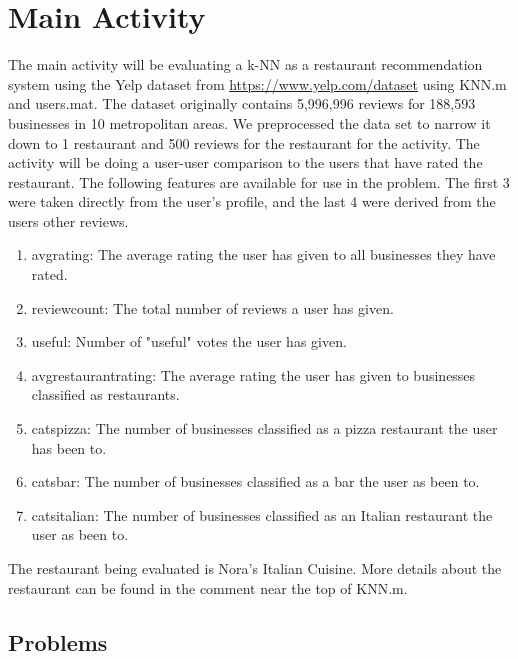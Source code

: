 \documentclass{report}
\begin{document}
\chapter*{Main Activity}

The main activity will be evaluating a k-NN as a restaurant recommendation system using the Yelp dataset from \href{https://www.yelp.com/dataset}{https://www.yelp.com/dataset} using KNN.m and users.mat.
The dataset originally contains 5,996,996 reviews for 188,593 businesses in 10 metropolitan areas.
We preprocessed the data set to narrow it down to 1 restaurant and 500 reviews for the restaurant for the activity. The activity will be doing a user-user comparison to the users that have rated the restaurant.
The following features are available for use in the problem. 
The first 3 were taken directly from the user's profile, and the last 4 were derived from the users other reviews.

\begin{enumerate}
\item avg\textunderscore rating: The average rating the user has given to all businesses they have rated.
\item review\textunderscore count: The total number of reviews a user has given.
\item useful: Number of "useful" votes the user has given.
\item avg\textunderscore restaurant\textunderscore rating: The average rating the user has given to businesses classified as restaurants.
\item cats\textunderscore pizza: The number of businesses classified as a pizza restaurant the user has been to.
\item cats\textunderscore bar: The number of businesses classified as a bar the user as been to.
\item cats\textunderscore italian: The number of businesses classified as an Italian restaurant the user as been to.
\end{enumerate}

The restaurant being evaluated is Nora's Italian Cuisine. More details about the restaurant can be found in the comment near the top of KNN.m.

\section*{Problems}
\end{document}
